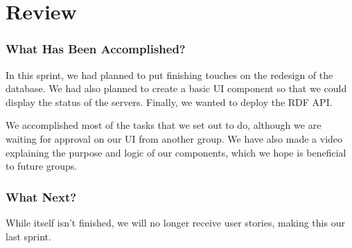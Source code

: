 \section{Review}\label{sec:sprint6review}

\subsubsection*{What Has Been Accomplished?}
In this sprint, we had planned to put finishing touches on the redesign of the database. We had also planned to create a basic UI component so that we could display the status of the servers. Finally, we wanted to deploy the RDF API.

We accomplished most of the tasks that we set out to do, although we are waiting for approval on our UI from another group. We have also made a video explaining the purpose and logic of our components, which we hope is beneficial to future \knox{} groups.

\subsubsection*{What Next?}
While \knox{} itself isn't finished, we will no longer receive user stories, making this our last sprint. 